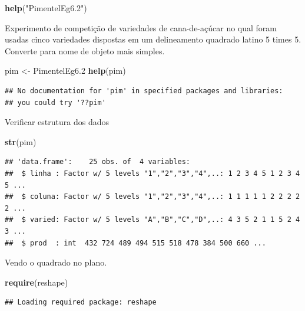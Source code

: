 \documentclass[
]{book}
\newenvironment{Shaded}{\begin{snugshade}}{\end{snugshade}}
\newcommand{\FloatTok}[1]{\textcolor[rgb]{0.00,0.00,0.81}{#1}}
\newcommand{\KeywordTok}[1]{\textcolor[rgb]{0.13,0.29,0.53}{\textbf{#1}}}
\newcommand{\NormalTok}[1]{#1}
\newcommand{\StringTok}[1]{\textcolor[rgb]{0.31,0.60,0.02}{#1}}
\begin{document}
\begin{Shaded}
\begin{Highlighting}[]
\KeywordTok{help}\NormalTok{(}\StringTok{"PimentelEg6.2"}\NormalTok{)}
\end{Highlighting}
\end{Shaded}

Experimento de competição de variedades de cana-de-açúcar no qual foram usadas cinco variedades dispostas em um delineamento quadrado latino 5 times 5. Converte para nome de objeto mais simples.

\begin{Shaded}
\begin{Highlighting}[]
\NormalTok{pim <-}\StringTok{ }\NormalTok{PimentelEg6}\FloatTok{.2} 
\KeywordTok{help}\NormalTok{(pim)}
\end{Highlighting}
\end{Shaded}

\begin{verbatim}
## No documentation for 'pim' in specified packages and libraries:
## you could try '??pim'
\end{verbatim}

Verificar estrutura dos dados

\begin{Shaded}
\begin{Highlighting}[]
\KeywordTok{str}\NormalTok{(pim)}
\end{Highlighting}
\end{Shaded}

\begin{verbatim}
## 'data.frame':    25 obs. of  4 variables:
##  $ linha : Factor w/ 5 levels "1","2","3","4",..: 1 2 3 4 5 1 2 3 4 5 ...
##  $ coluna: Factor w/ 5 levels "1","2","3","4",..: 1 1 1 1 1 2 2 2 2 2 ...
##  $ varied: Factor w/ 5 levels "A","B","C","D",..: 4 3 5 2 1 1 5 2 4 3 ...
##  $ prod  : int  432 724 489 494 515 518 478 384 500 660 ...
\end{verbatim}

Vendo o quadrado no plano.

\begin{Shaded}
\begin{Highlighting}[]
\KeywordTok{require}\NormalTok{(reshape)}
\end{Highlighting}
\end{Shaded}

\begin{verbatim}
## Loading required package: reshape
\end{verbatim}
\end{document}
